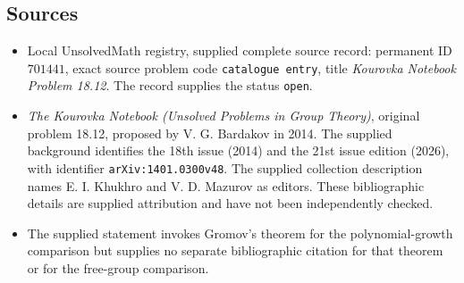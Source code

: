 \documentclass[11pt]{article}
\begin{document}
\subsection{Sources}
\begin{itemize}
\item Local UnsolvedMath registry, supplied complete source record: permanent ID \(701441\), exact source problem code \texttt{catalogue entry}, title \emph{Kourovka Notebook Problem 18.12}. The record supplies the status \texttt{open}.
\item \emph{The Kourovka Notebook (Unsolved Problems in Group Theory)}, original problem 18.12, proposed by V. G. Bardakov in 2014. The supplied background identifies the 18th issue (2014) and the 21st issue edition (2026), with identifier \texttt{arXiv:1401.0300v48}. The supplied collection description names E. I. Khukhro and V. D. Mazurov as editors. These bibliographic details are supplied attribution and have not been independently checked.
\item The supplied statement invokes Gromov's theorem for the polynomial-growth comparison but supplies no separate bibliographic citation for that theorem or for the free-group comparison.
\end{itemize}
\end{document}
